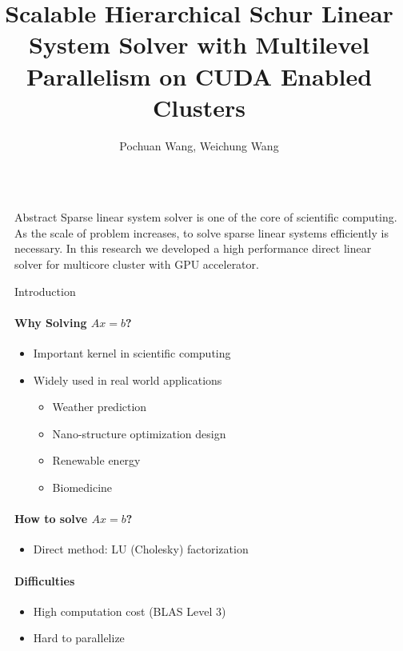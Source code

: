 \documentclass[final]{beamer}
\title{Scalable Hierarchical Schur Linear System Solver with Multilevel Parallelism on CUDA Enabled Clusters}
\author{Pochuan Wang, Weichung Wang}
\institute{Institute of Applied Mathematical Sciences, National Taiwan University}
\newlength{\sepwid}
\newlength{\onecolwid}
\begin{document}
  \begin{frame}[t]
    \begin{columns}[t]
      \begin{column}{\sepwid}\end{column}
        \begin{column}{\onecolwid}
        \begin{block}{Abstract}
          Sparse linear system solver is one of the core of scientific computing.
          As the scale of problem increases, to solve sparse linear systems efficiently
          is necessary. In this research we developed a high performance direct linear
          solver for multicore cluster with GPU accelerator.
        \end{block}
        \begin{block}{Introduction}
          \paragraph{\textbf{Why Solving $Ax=b$?}}
          \begin{itemize}
            \item Important kernel in scientific computing
            \item Widely used in real world applications
            \begin{itemize}
              \item Weather prediction
              \item Nano-structure optimization design 
              \item Renewable energy
              \item Biomedicine
            \end{itemize}
          \end{itemize}
          \paragraph{\textbf{How to solve $Ax=b$?}}
          \begin{itemize}
            \item Direct method: LU (Cholesky) factorization
          \end{itemize}
          \paragraph{\textbf{Difficulties}}
          \begin{itemize}
            \item High computation cost (BLAS Level 3)
            \item Hard to parallelize
          \end{itemize}

\end{block}
\end{column}
\end{columns}
\end{frame}
\end{document}
